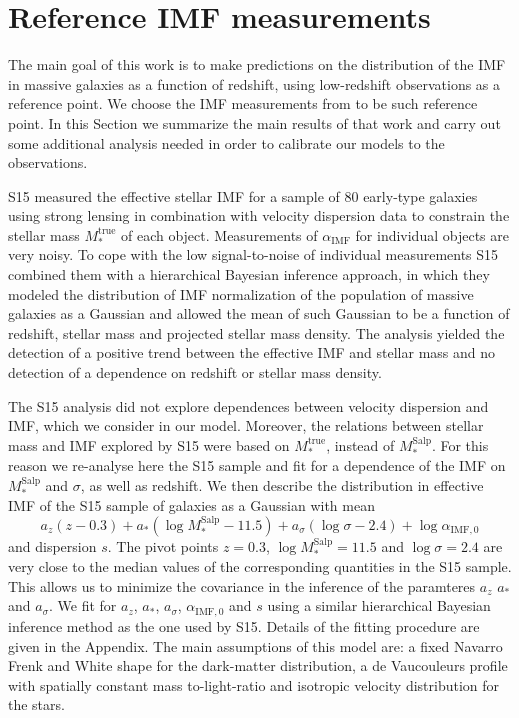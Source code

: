 \documentclass[usenatbib]{mnras}
\def\mtrue{M_*^{\mathrm{true}}}
\def\msalp{M_*^{\mathrm{Salp}}}
\def\aimf{\alpha_{\mathrm{IMF}}}
\begin{document}
\section{Reference IMF measurements}\label{sect:obs}

The main goal of this work is to make predictions on the distribution
of the IMF in massive galaxies as a function of redshift, using
low-redshift observations as a reference point. 
We choose the IMF measurements from \citet[][hereafter S15]{Son++15} to
be such reference point.
In this Section we summarize the main
results of that work and carry out some additional analysis needed in
order to calibrate our models to the observations.

S15 measured the effective stellar IMF for a sample of 80
early-type galaxies using strong lensing in combination with velocity
dispersion data to constrain the stellar mass $\mtrue$ of each object.
Measurements of $\aimf$ for individual objects are very noisy. To cope
with the low signal-to-noise of individual measurements S15 combined
them with a hierarchical Bayesian inference approach, in which they
modeled the distribution of IMF normalization of the population of
massive galaxies as a Gaussian and allowed the mean of such Gaussian
to be a function of redshift, stellar mass and projected stellar mass
density.  The analysis yielded the detection of a positive trend
between the effective IMF and stellar mass and no detection of a
dependence on redshift or stellar mass density.

The S15 analysis did not explore dependences between velocity dispersion and IMF, which we consider in our model.
Moreover, the relations between stellar mass and IMF explored by S15 were based on $\mtrue$, instead of $\msalp$.
For this reason we re-analyse here the S15 sample and fit for a dependence of the IMF on $\msalp$ and $\sigma$, as well as redshift. We then describe the distribution in effective IMF of the S15 sample of galaxies as a Gaussian with mean
\begin{equation}\label{eq:sl2sfit}
a_z(z - 0.3) + a_*(\log{\msalp} - 11.5) + a_\sigma(\log{\sigma} - 2.4) + \log{\alpha_{\mathrm{IMF},0}}
\end{equation}
and dispersion $s$. 
The pivot points $z=0.3$, $\log{\msalp}=11.5$ and $\log{\sigma}=2.4$ are very close to the median values of the corresponding quantities in the S15 sample. This allows us to minimize the covariance in the inference of the paramteres $a_z$ $a_*$ and $a_\sigma$.
%
We fit for $a_z$,
$a_*$, $a_\sigma$, $\alpha_{\mathrm{IMF},0}$ and $s$ using a similar
hierarchical Bayesian inference method as the one used by S15.
Details of the fitting procedure are given in the Appendix.  The main
assumptions of this model are: a fixed Navarro Frenk and White
\citep[][NFW]{NFW97} shape for the dark-matter distribution, a de Vaucouleurs \citep{deV48} profile with spatially constant
mass to-light-ratio and isotropic velocity distribution
for the stars.  
\end{document}
